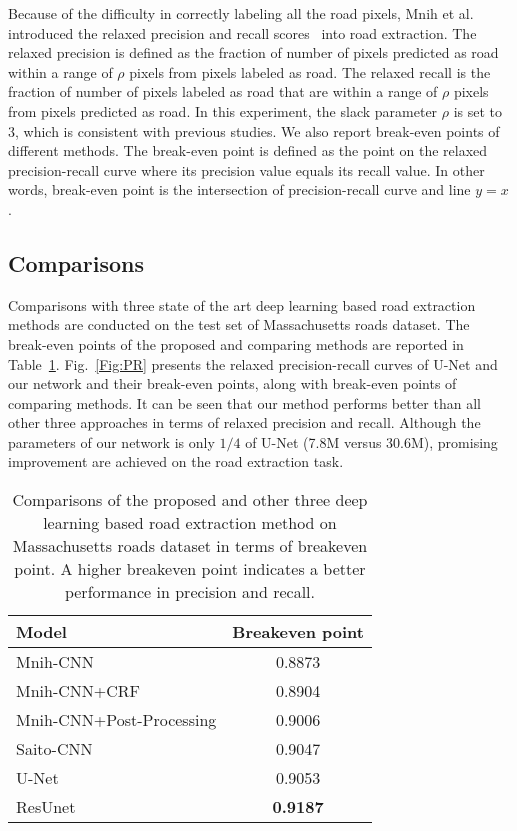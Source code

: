 \documentclass[journal]{IEEEtran}
\begin{document}
Because of the difficulty in correctly labeling all the road pixels, Mnih et al.~\cite{mnih2010learning} introduced the relaxed precision and recall scores~\cite{Ehrig2005Relaxed} into road extraction. The relaxed precision is defined as the fraction of number of pixels predicted as road within a range of $\rho$ pixels from pixels labeled as road. The relaxed recall is the fraction of number of pixels labeled as road that are within a range of $\rho$ pixels from pixels predicted as road. In this experiment, the slack parameter $\rho$ is set to 3, which is consistent with previous studies\cite{mnih2010learning,Saito2016Multiple}. We also report break-even points of different methods. The break-even point is defined as the point on the relaxed precision-recall curve where its precision value equals its recall value. In other words, break-even point is the intersection of precision-recall curve and line $y=x$. 

\subsection{Comparisons}
Comparisons with three state of the art deep learning based road extraction methods are conducted on the test set of Massachusetts roads dataset. The break-even points of the proposed and comparing methods are reported in Table~\ref{Table:Value at Breakeven Point}. Fig.~\ref{Fig:PR} presents the relaxed precision-recall curves of U-Net and our network and their break-even points, along with break-even points of comparing methods. It can be seen that our method performs better than all other three approaches in terms of relaxed precision and recall. Although the parameters of our network is only $1/4$ of U-Net (7.8M versus 30.6M), promising improvement are achieved on the road extraction task. 

\begin{table}[!hbp]
\vspace{-0.2cm}
\begin{center}
\caption{Comparisons of the proposed and other three deep learning based road extraction method on Massachusetts roads dataset in terms of breakeven point. A higher breakeven point indicates a better performance in precision and recall. }
\label{Table:Value at Breakeven Point}
\begin{tabular}{l|c}
\hline
Model & Breakeven point\\
\hline
Mnih-CNN\cite{mnih2010learning} & 0.8873  \\
\hline
Mnih-CNN+CRF\cite{mnih2010learning} & 0.8904  \\
\hline
Mnih-CNN+Post-Processing\cite{mnih2010learning} & 0.9006  \\
\hline
Saito-CNN\cite{Saito2016Multiple} & 0.9047 \\
\hline
U-Net\cite{U-NET2015} & 0.9053 \\
\hline
ResUnet & \textbf{0.9187} \\
\hline
\end{tabular}
\end{center}
\vspace{-0.3cm}
\end{table}
\end{document}
